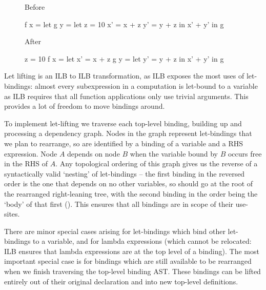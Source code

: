 \documentclass[dissertation.tex]{subfiles}
\begin{document}
{{        \begin{figure}[h]
        \begin{minipage}[t]{0.45\textwidth}
        \centering
        Before
        \vspace{-5mm}
        \begin{haskellfigure}
        f x = let
            g y = let
                z = 10
                x' = x + z
                y' = y + z
                in x' + y'
            in g
        \end{haskellfigure}
        \end{minipage}
        \hspace{5mm}
        \begin{minipage}[t]{0.45\textwidth}
        \centering
        After
        \vspace{-5mm}
        \begin{haskellfigure}
        z = 10
        f x = let
            x' = x + z
            g y = let y' = y + z in x' + y'
            in g
        \end{haskellfigure}
        \end{minipage}
        \caption{}
        \label{fig:let-lifting-example}
        \end{figure}

        Let lifting is an ILB to ILB transformation, as ILB exposes the most uses of let-bindings: almost every subexpression in a computation is let-bound to a variable as ILB requires that all function applications only use trivial arguments. This provides a lot of freedom to move bindings around.

        To implement let-lifting we traverse each top-level binding, building up and processing a dependency graph. Nodes in the graph represent let-bindings that we plan to rearrange, so are identified by a binding of a variable and a RHS expression. Node \(A\) depends on node \(B\) when the variable bound by \(B\) occurs free in the RHS of \(A\). Any topological ordering of this graph gives us the reverse of a syntactically valid `nesting' of let-bindings -- the first binding in the reversed order is the one that depends on no other variables, so should go at the root of the rearranged right-leaning tree, with the second binding in the order being the `body' of that first (). This ensures that all bindings are in scope of their use-sites.
        
        There are minor special cases arising for let-bindings which bind other let-bindings to a variable, and for lambda expressions (which cannot be relocated: ILB ensures that lambda expressions are at the top level of a binding). The most important special case is for bindings which are still available to be rearranged when we finish traversing the top-level binding AST. These bindings can be lifted entirely out of their original declaration and into new top-level definitions.
    }
}
\end{document}
